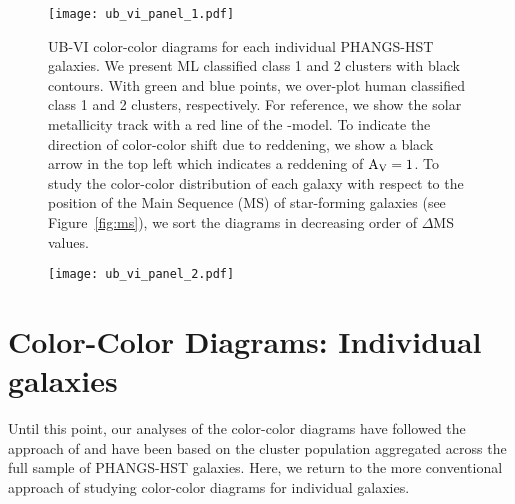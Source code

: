 \documentclass[linenumbers]{aastex63}
\begin{document}
\begin{figure*}[h]
\texttt{[image: ub\_vi\_panel\_1.pdf]}
 \caption{UB-VI color-color diagrams for each individual PHANGS-HST galaxies. We present ML classified class 1 and 2 clusters with black contours. With green and blue points, we over-plot human classified class 1 and 2 clusters, respectively. For reference, we show the solar metallicity track with a red line of the -model. To indicate the direction of color-color shift due to reddening, we show a black arrow in the top left which indicates a reddening of ${\rm A_{V} = 1}$. To study the color-color distribution of each galaxy with respect to the position of the Main Sequence (MS) of star-forming galaxies (see Figure~\ref{fig:ms}), we sort the diagrams in decreasing order of $\Delta$MS values.}
 \label{fig:ub_vi_1}
\end{figure*}
%
\begin{figure*}[h]
\texttt{[image: ub\_vi\_panel\_2.pdf]}
\end{figure*}

\section{Color-Color Diagrams: Individual galaxies}\label{ssect:cc_sf}
%
%

Until this point, our analyses of the color-color diagrams have followed the approach of \citet{lee23ubvi} and have been based on the cluster population aggregated across the full sample of PHANGS-HST galaxies.  Here, we return to the more conventional approach of studying color-color diagrams for individual galaxies.
\end{document}
